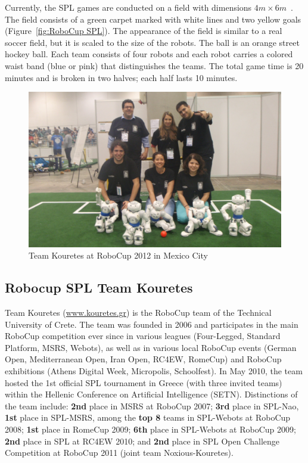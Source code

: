 Currently, the SPL games are conducted on a field with dimensions $4m \times 6m$~\cite{SPLrules2012}. The field consists of a green carpet marked with white lines and two yellow goals (Figure~\ref{fig:RoboCup SPL}). The appearance of the field is similar to a real soccer field, but it is scaled to the size of the robots. The ball is an orange street hockey ball. Each team consists of four robots and each robot carries a colored waist band (blue or pink) that distinguishes the teams. The total game time is 20 minutes and is broken in two halves; each half lasts 10 minutes.




\begin{figure}[t!]
	\begin{center}
		\includegraphics[width=.9\textwidth]{Figures/robocup2012-team.jpg}
 		\caption{Team Kouretes at RoboCup 2012 in Mexico City}
 		\label{fig:Kouretes2012}
	\end{center}
\end{figure}

\subsection{Robocup SPL Team Kouretes}

Team Kouretes (\url{www.kouretes.gr}) is the RoboCup team of the Technical University of Crete. The team was founded in 2006 and participates in the main RoboCup competition ever since in various leagues (Four-Legged, Standard Platform, MSRS, Webots), as well as in various local RoboCup events (German Open, Mediterranean Open, Iran Open, RC4EW, RomeCup) and RoboCup exhibitions (Athens Digital Week, Micropolis, Schoolfest). In May 2010, the team hosted the 1st official SPL tournament in Greece (with three invited teams) within the Hellenic Conference on Artificial Intelligence (SETN). Distinctions of the team include: {\bf 2nd} place in MSRS at RoboCup 2007; {\bf 3rd} place in SPL-Nao, {\bf 1st} place in SPL-MSRS, among the {\bf top 8} teams in SPL-Webots at RoboCup 2008; {\bf 1st} place in RomeCup 2009; {\bf 6th} place in SPL-Webots at RoboCup 2009; {\bf 2nd} place in SPL at RC4EW 2010; and {\bf 2nd} place in SPL Open Challenge Competition at RoboCup 2011 (joint team Noxious-Kouretes).

